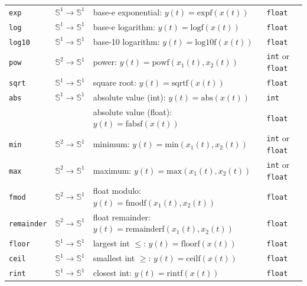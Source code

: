 \begin{tabular}{|l|l|l|l|}
\texttt{exp} & $\mathbb{S}^{1}\rightarrow\mathbb{S}^{1}$ & base-e exponential: $y(t)=\mathrm{expf}(x(t))$  & \texttt{float}\\
\texttt{log} & $\mathbb{S}^{1}\rightarrow\mathbb{S}^{1}$ & base-e logarithm: $y(t)=\mathrm{logf}(x(t))$  & \texttt{float}\\
\texttt{log10} & $\mathbb{S}^{1}\rightarrow\mathbb{S}^{1}$ & base-10 logarithm: $y(t)=\mathrm{log10f}(x(t))$ & \texttt{float} \\
\texttt{pow} & $\mathbb{S}^{2}\rightarrow\mathbb{S}^{1}$ & power: $y(t)=\mathrm{powf}(x_{1}(t),x_{2}(t))$ & \texttt{int} or \texttt{float} \\
\texttt{sqrt} & $\mathbb{S}^{1}\rightarrow\mathbb{S}^{1}$ & square root: $y(t)=\mathrm{sqrtf}(x(t))$  & \texttt{float}\\
\texttt{abs} & $\mathbb{S}^{1}\rightarrow\mathbb{S}^{1}$ & absolute value (int): $y(t)=\mathrm{abs}(x(t))$ & \texttt{int}  \\
			&											 & absolute value (float): $y(t)=\mathrm{fabsf}(x(t))$  &  \texttt{float}\\
\texttt{min} & $\mathbb{S}^{2}\rightarrow\mathbb{S}^{1}$ & minimum: $y(t)=\mathrm{min}(x_{1}(t),x_{2}(t))$  & \texttt{int} or \texttt{float} \\
\texttt{max} & $\mathbb{S}^{2}\rightarrow\mathbb{S}^{1}$ & maximum: $y(t)=\mathrm{max}(x_{1}(t),x_{2}(t))$  & \texttt{int} or \texttt{float} \\
\texttt{fmod} & $\mathbb{S}^{2}\rightarrow\mathbb{S}^{1}$ & float modulo: $y(t)=\mathrm{fmodf}(x_{1}(t),x_{2}(t))$ & \texttt{float} \\
\texttt{remainder} & $\mathbb{S}^{2}\rightarrow\mathbb{S}^{1}$ & float remainder: $y(t)=\mathrm{remainderf}(x_{1}(t),x_{2}(t))$ & \texttt{float} \\

\texttt{floor} & $\mathbb{S}^{1}\rightarrow\mathbb{S}^{1}$ & largest int $\leq$: $y(t)=\mathrm{floorf}(x(t))$  & \texttt{float}\\
\texttt{ceil} & $\mathbb{S}^{1}\rightarrow\mathbb{S}^{1}$ & smallest int $\geq$: $y(t)=\mathrm{ceilf}(x(t))$  & \texttt{float}\\
\texttt{rint} & $\mathbb{S}^{1}\rightarrow\mathbb{S}^{1}$ & closest int: $y(t)=\mathrm{rintf}(x(t))$ & \texttt{float} \\

\hline
\end{tabular}
\bigskip

